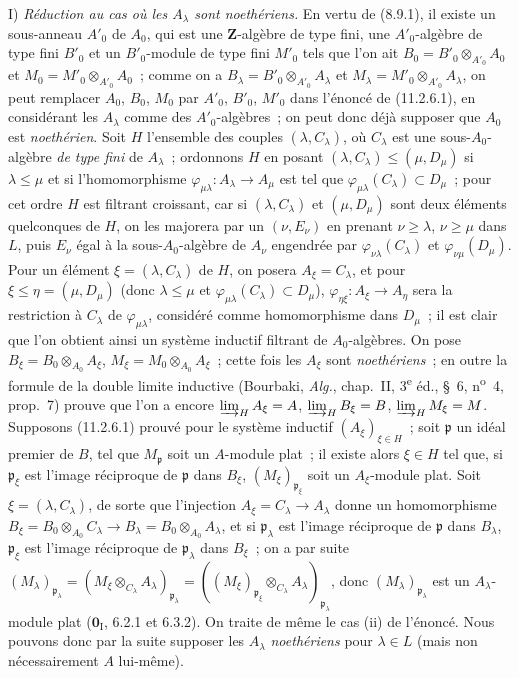 \medskip
\noindent I) \emph{Réduction au cas où les $A_\lambda$ sont
noethériens.} En vertu de (8.9.1), il existe un sous-anneau $A'_0$ de $A_0$,
qui est une $\mathbf Z$-algèbre de type fini, une $A'_0$-algèbre de type fini
$B'_0$ et un $B'_0$-module de type fini $M'_0$ tels que l'on ait
$B_0=B'_0\otimes_{A'_0}A_0$ et $M_0=M'_0\otimes_{A'_0}A_0$~; comme on a
$B_\lambda=B'_0\otimes_{A'_0}A_\lambda$ et
$M_\lambda=M'_0\otimes_{A'_0}A_\lambda$, on peut remplacer $A_0$, $B_0$,
$M_0$ par $A'_0$, $B'_0$, $M'_0$ dans l'énoncé de (11.2.6.1), en considérant
les $A_\lambda$ comme des $A'_0$-algèbres~; on peut donc déjà supposer que
$A_0$ est \emph{noethérien}. Soit $H$ l'ensemble des couples
$(\lambda,C_\lambda)$, où $C_\lambda$ est une sous-$A_0$-algèbre \emph{de
type fini} de $A_\lambda$~; ordonnons $H$ en posant
$(\lambda,C_\lambda)\leq(\mu,D_\mu)$ si $\lambda\leq\mu$ et si
l'homomorphisme $\varphi_{\mu\lambda}:A_\lambda\to A_\mu$ est tel que
$\varphi_{\mu\lambda}(C_\lambda)\subset D_\mu$~; pour cet ordre $H$ est
filtrant croissant, car si $(\lambda,C_\lambda)$ et $(\mu,D_\mu)$ sont deux
éléments quelconques de $H$, on les majorera par un $(\nu,E_\nu)$ en prenant
$\nu\geq\lambda$, $\nu\geq\mu$ dans $L$, puis $E_\nu$ égal à la
sous-$A_0$-algèbre de $A_\nu$ engendrée par
$\varphi_{\nu\lambda}(C_\lambda)$ et $\varphi_{\nu\mu}(D_\mu)$. Pour un
élément $\xi=(\lambda,C_\lambda)$ de $H$, on posera $A_\xi=C_\lambda$, et
pour $\xi\leq\eta=(\mu,D_\mu)$ (donc $\lambda\leq\mu$ et
$\varphi_{\mu\lambda}(C_\lambda)\subset D_\mu$),
$\varphi_{\eta\xi}:A_\xi\to A_\eta$ sera la restriction à $C_\lambda$ de
$\varphi_{\mu\lambda}$, considéré comme homomorphisme dans $D_\mu$~; il est
clair que l'on obtient ainsi un système inductif filtrant de $A_0$-algèbres.
On pose $B_\xi=B_0\otimes_{A_0}A_\xi$,
$M_\xi=M_0\otimes_{A_0}A_\xi$~; cette fois les $A_\xi$ sont
\emph{noethériens}~; en outre la formule de la double limite inductive (Bourbaki,
\emph{Alg.}, chap.~II, 3\textsuperscript{e} éd., \S~6, n\textsuperscript{o}~4, prop.~7) prouve que
l'on a encore
$\varinjlim_HA_\xi=A$, $\varinjlim_HB_\xi=B$,
$\varinjlim_HM_\xi=M$. Supposons (11.2.6.1) prouvé pour le système inductif
$(A_\xi)_{\xi\in H}$~; soit $\mathfrak p$ un idéal premier de $B$,
tel que $M_{\mathfrak p}$ soit un $A$-module plat~; il existe alors
$\xi\in H$ tel que, si $\mathfrak p_\xi$ est l'image
réciproque de
$\mathfrak p$ dans $B_\xi$, $(M_\xi)_{\mathfrak p_\xi}$ soit un
$A_\xi$-module plat. Soit $\xi=(\lambda,C_\lambda)$, de sorte que
l'injection $A_\xi=C_\lambda\to A_\lambda$ donne un homomorphisme
$B_\xi=B_0\otimes_{A_0}C_\lambda\to B_\lambda=B_0\otimes_{A_0}A_\lambda$,
et si $\mathfrak p_\lambda$ est l'image réciproque de $\mathfrak p$ dans
$B_\lambda$, $\mathfrak p_\xi$ est l'image réciproque de
$\mathfrak p_\lambda$ dans $B_\xi$~; on a par suite
$(M_\lambda)_{\mathfrak p_\lambda}
=(M_\xi\otimes_{C_\lambda}A_\lambda)_{\mathfrak p_\lambda}
=((M_\xi)_{\mathfrak p_\xi}\otimes_{C_\lambda}A_\lambda)_{\mathfrak p_\lambda}$,
donc $(M_\lambda)_{\mathfrak p_\lambda}$ est un $A_\lambda$-module plat
($\mathbf 0_{\mathrm I}$, 6.2.1 et 6.3.2). On traite de même le cas (ii) de
l'énoncé. Nous pouvons donc par la suite supposer les $A_\lambda$
\emph{noethériens} pour $\lambda\in L$ (mais non nécessairement $A$ lui-même).


